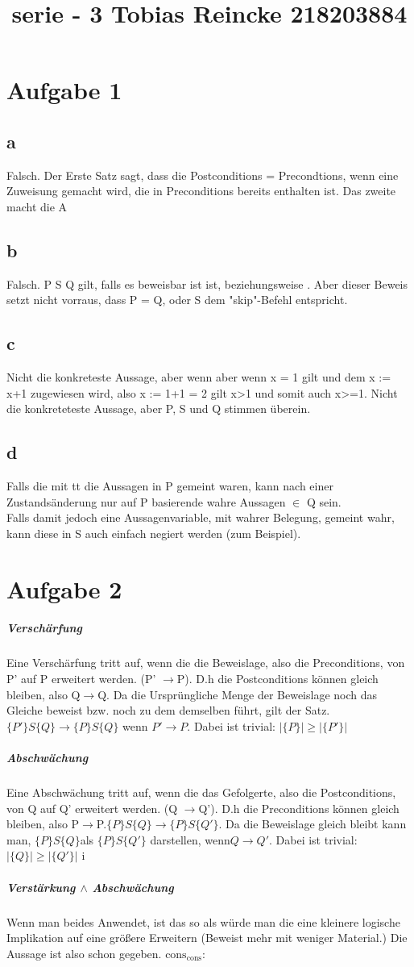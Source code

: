 \documentclass[10pt,a4paper]{article}
\title{serie - 3  Tobias Reincke 218203884}
\begin{document}
\section{Aufgabe 1}
\subsection{a}
Falsch. Der Erste Satz sagt, dass die Postconditions = Precondtions, wenn eine Zuweisung gemacht wird, die in Preconditions bereits enthalten ist.
Das zweite macht die A
\subsection{b}
Falsch. P S Q  gilt, falls es beweisbar ist ist, beziehungsweise . Aber dieser Beweis setzt nicht vorraus, dass P = Q, oder S dem "skip"-Befehl entspricht.
\subsection{c}

Nicht die konkreteste Aussage, aber wenn aber wenn x = 1 gilt und dem x := x+1 zugewiesen wird, also x := 1+1 = 2 gilt x>1 und somit auch x>=1. Nicht die konkreteteste Aussage, aber P, S  und Q stimmen überein.
\subsection{d} Falls die mit {tt} die Aussagen in P gemeint waren, kann nach einer Zustandsänderung nur auf P basierende  wahre Aussagen $\in$ Q sein. \\
Falls damit jedoch eine Aussagenvariable, mit wahrer Belegung, gemeint wahr, kann diese in S auch einfach negiert werden (zum Beispiel). 
\section{Aufgabe 2}

 \subparagraph{Verschärfung}
 Eine Verschärfung tritt auf, wenn die die Beweislage, also die Preconditions, von P' auf P erweitert werden. (P' $\rightarrow$P). D.h die  Postconditions können gleich bleiben, also Q$\rightarrow$Q. Da die Ursprüngliche Menge der Beweislage noch das Gleiche beweist bzw. noch zu dem demselben führt, gilt der Satz. $\{P'\} S  \{Q\} \rightarrow \{P\} S\{Q\} $ wenn $P'\rightarrow P$. Dabei ist trivial: $|\{P\}|\geq|\{P' \}|$

 \subparagraph{Abschwächung} 
  Eine Abschwächung tritt auf, wenn die das Gefolgerte, also die Postconditions, von Q auf Q' erweitert werden. (Q $\rightarrow$Q'). D.h die  Preconditions können gleich bleiben, also P$\rightarrow$P.$\{P\} S  \{Q\} \rightarrow \{P\} S \{Q'\} $. Da die Beweislage gleich bleibt kann man, $\{P\} S  \{Q\} $als $ \{P\} S \{Q'\} $ darstellen, wenn$Q \rightarrow Q' $. Dabei ist trivial: $|\{Q\}|\geq|\{Q'\}|$
i\subparagraph{Verstärkung $\wedge$ Abschwächung}
Wenn man beides Anwendet, ist das so als würde man die eine kleinere  logische Implikation auf eine größere Erweitern (Beweist mehr mit weniger Material.) Die Aussage ist  also schon gegeben.
$\text{cons}_\text{cons}$:
\end{document}
